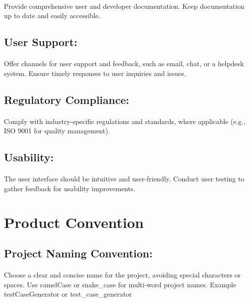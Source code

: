 \documentclass{article}
\begin{document}
\paragraph{}
Provide comprehensive user and developer documentation.
Keep documentation up to date and easily accessible.

\subsection{User Support:}
\paragraph{}
Offer channels for user support and feedback, such as email, chat, or a helpdesk system.
Ensure timely responses to user inquiries and issues.

\subsection{Regulatory Compliance:}
\paragraph{}
Comply with industry-specific regulations and standards, where applicable (e.g., ISO 9001 for quality management).

\subsection{Usability:}
\paragraph{}
The user interface should be intuitive and user-friendly.
Conduct user testing to gather feedback for usability improvements.


\section{Product Convention}
\subsection{Project Naming Convention:}
\paragraph{}
Choose a clear and concise name for the project, avoiding special characters or spaces.
Use camelCase or snake\_case for multi-word project names.
Example\: testCaseGenerator or test\_case\_generator
\end{document}
